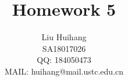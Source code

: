 \title{
    Homework 5
}

\author{\name Liu Huihang  \\
        \addr SA18017026  \\
        QQ: 184050473 \\
        MAIL: huihang@mail.ustc.edu.cn
        }

\editor{}

\maketitle